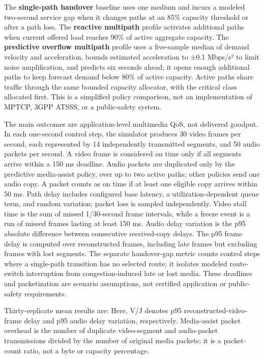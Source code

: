 \documentclass[
  american,
  11pt,
]{article}
\begin{document}
The \textbf{single-path handover} baseline uses one medium and incurs a
modeled two-second service gap when it changes paths at an 85\% capacity
threshold or after a path loss. The \textbf{reactive multipath} profile
activates additional paths when current offered load reaches 90\% of
active aggregate capacity. The \textbf{predictive overflow multipath}
profile uses a five-sample median of demand velocity and acceleration,
bounds estimated acceleration to ±0.1 Mbps/s² to limit noise
amplification, and predicts six seconds ahead; it opens enough
additional paths to keep forecast demand below 80\% of active capacity.
Active paths share traffic through the same bounded capacity allocator,
with the critical class allocated first. This is a simplified policy
comparison, not an implementation of MPTCP, 3GPP ATSSS, or a
public-safety system.

The main outcomes are application-level multimedia QoS, not delivered
goodput. In each one-second control step, the simulator produces 30
video frames per second, each represented by 14 independently
transmitted segments, and 50 audio packets per second. A video frame is
considered on time only if all segments arrive within a 150 ms deadline.
Audio packets are duplicated only by the predictive media-assist policy,
over up to two active paths; other policies send one audio copy. A
packet counts as on time if at least one eligible copy arrives within 50
ms. Path delay includes configured base latency, a utilization-dependent
queue term, and random variation; packet loss is sampled independently.
Video stall time is the sum of missed 1/30-second frame intervals, while
a freeze event is a run of missed frames lasting at least 150 ms. Audio
delay variation is the p95 absolute difference between consecutive
received-copy delays. The p95 frame delay is computed over reconstructed
frames, including late frames but excluding frames with lost segments.
The separate handover-gap metric counts control steps where a
single-path transition has no selected route; it isolates modeled
route-switch interruption from congestion-induced late or lost media.
These deadlines and packetization are scenario assumptions, not
certified application or public-safety requirements.

Thirty-replicate mean results are: Here, V/J denotes p95
reconstructed-video-frame delay and p95 audio delay variation,
respectively. Media-assist packet overhead is the number of duplicate
video-segment and audio-packet transmissions divided by the number of
original media packets; it is a packet-count ratio, not a byte or
capacity percentage.
\end{document}
